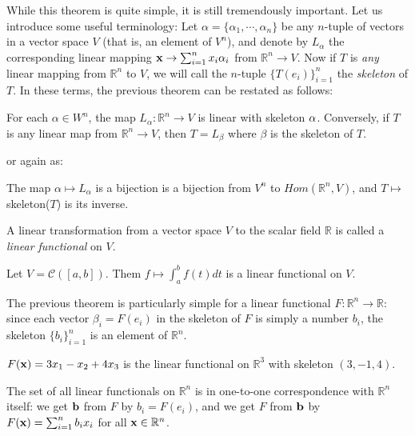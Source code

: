 \documentclass[12pt,letterpaper,reqno]{article}
\numberwithin{equation}{section}
\newcommand{\ti}[1]{\textit{#1}}
\begin{document}
While this theorem is quite simple, it is still tremendously important. Let us introduce some useful terminology: Let $\alpha=\{\alpha_1,\cdots,\alpha_n\}$ be any $n$-tuple of vectors in a vector space $V$ (that is, an element of $V^n$), and denote by $L_{\alpha}$ the corresponding linear mapping ${\bf x} \to \sum_{i=1}^nx_i\alpha_i$ from $\mathbb{R}^n \to V$. Now if $T$ is \ti{any} linear mapping from $\mathbb{R}^n$ to $V$, we will call the $n$-tuple $\{T(e_i)\}_{i=1}^n$ the \ti{skeleton} of $T$. In these terms, the previous theorem can be restated as follows:

\begin{thm}
	For each $\alpha \in W^n$, the map $L_\alpha:\mathbb{R}^n \to V$ is linear with skeleton ${\bf \alpha}$. Conversely, if $T$ is any linear map from $\mathbb{R}^n \to V$, then $T=L_\beta$ where $\beta$ is the skeleton of $T$. 
\end{thm}


or again as: 
\begin{thm}
	The map $\alpha \mapsto L_\alpha$ is a bijection is a bijection from $V^n$ to $Hom(\mathbb{R}^n,V)$, and $T \mapsto$ skeleton($T$) is its inverse.
\end{thm}

\begin{defn}
	A linear transformation from a vector space $V$ to the scalar field $\mathbb{R}$ is called a \ti{linear functional} on $V$.
\end{defn}

\begin{example}
Let $V=\mathscr{C}([a,b])$. Them $f \mapsto \int_a^b f(t)dt$ is a linear functional on $V$.	
\end{example}

The previous theorem is particularly simple for a linear functional $F:\mathbb{R}^n \to \mathbb{R}$: since each vector $\beta_i=F(e_i)$ in the skeleton of $F$ is simply a number $b_i$, the skeleton $\{b_i\}_{i=1}^n$ is an element of $\mathbb{R}^n$.

\begin{example}
$F({\bf x})=3x_1-x_2+4x_3$ is the linear functional on $\mathbb{R}^3$ with skeleton $(3,-1,4)$.	
\end{example}

The set of all linear functionals on $\mathbb{R}^n$ is in one-to-one correspondence with $\mathbb{R}^n$ itself: we get ${\bf b}$ from $F$ by $b_i=F(e_i)$, and we get $F$ from ${\bf b}$ by $F({\bf x})=\sum_{i=1}^n b_ix_i$ for all ${\bf x} \in \mathbb{R}^n$.
\end{document}
